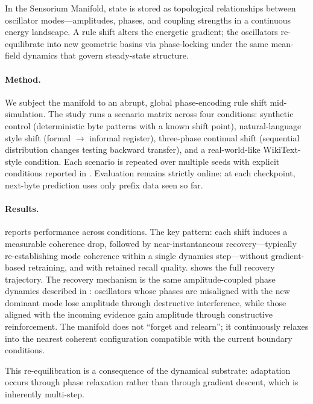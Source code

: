 \documentclass[11pt,a4paper]{article}
\begin{document}
In the Sensorium Manifold, state is stored as topological relationships between oscillator modes---amplitudes, phases, and coupling strengths in a continuous energy landscape. A rule shift alters the energetic gradient; the oscillators re-equilibrate into new geometric basins via phase-locking under the same mean-field dynamics that govern steady-state structure.

\paragraph{Method.}
We subject the manifold to an abrupt, global phase-encoding rule shift mid-simulation. The study runs a scenario matrix across four conditions: synthetic control (deterministic byte patterns with a known shift point), natural-language style shift (formal $\to$ informal register), three-phase continual shift (sequential distribution changes testing backward transfer), and a real-world-like WikiText-style condition. Each scenario is repeated over multiple seeds with explicit conditions reported in . Evaluation remains strictly online: at each checkpoint, next-byte prediction uses only prefix data seen so far.

\paragraph{Results.}
 reports performance across conditions. The key pattern: each shift induces a measurable coherence drop, followed by near-instantaneous recovery---typically re-establishing mode coherence within a single dynamics step---without gradient-based retraining, and with retained recall quality.  shows the full recovery trajectory. The recovery mechanism is the same amplitude-coupled phase dynamics described in : oscillators whose phases are misaligned with the new dominant mode lose amplitude through destructive interference, while those aligned with the incoming evidence gain amplitude through constructive reinforcement. The manifold does not ``forget and relearn''; it continuously relaxes into the nearest coherent configuration compatible with the current boundary conditions.

This re-equilibration is a consequence of the dynamical substrate: adaptation occurs through phase relaxation rather than through gradient descent, which is inherently multi-step.

\end{document}
